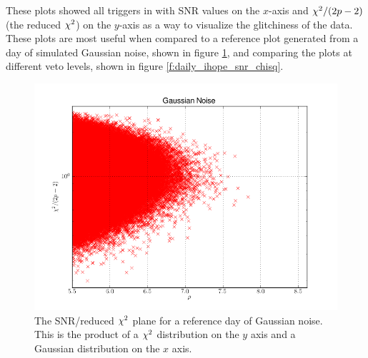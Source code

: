 
These plots showed all triggers in with SNR values on the $x$-axis and
$\chi^2 / (2p-2)$ (the reduced $\chisq$) on the $y$-axis as a way to
visualize the glitchiness of the data.  These plots are most useful
when compared to a reference plot generated from a day of simulated
Gaussian noise, shown in figure \ref{f:gaussian_snr_chisq}, and
comparing the plots at different veto levels, shown in figure
\ref{f:daily_ihope_snr_chisq}.

\begin{figure}
\includegraphics[width=0.85\linewidth]{figures/detchar/GAUSSIAN_0_UNCLUSTERED_chisq.png}
\caption[SNR/reduced $\chisq$ values in Gaussian noise]{
\label{f:gaussian_snr_chisq}
The SNR/reduced $\chisq$ plane for a reference day of
Gaussian noise.  This is the product of a $\chisq$ distribution on the
$y$ axis and a Gaussian distribution on the $x$ axis.}
\end{figure}%

